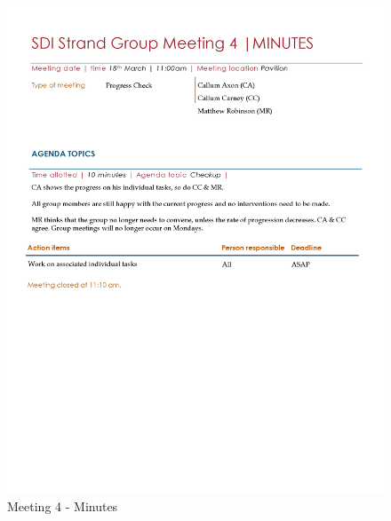 \documentclass[
  english,
  a4paper,
,tablecaptionabove
]{scrartcl}
\begin{document}
\begin{figure}
\centering
\includegraphics{images/meeting-minutes/meeting-4.png}
\caption{Meeting 4 - Minutes}
\end{figure}
\end{document}
